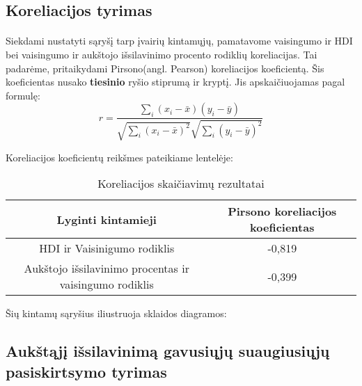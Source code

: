 \pagebreak


\subsection{Koreliacijos tyrimas}
\paragraph{} Siekdami nustatyti sąryšį tarp įvairių kintamųjų, pamatavome vaisingumo ir HDI bei vaisingumo ir aukštojo išsilavinimo procento rodiklių koreliacijas. Tai padarėme, pritaikydami Pirsono(angl. Pearson) koreliacijos koeficientą. Šis koeficientas nusako \textbf{tiesinio} ryšio stiprumą ir kryptį. Jis apskaičiuojamas pagal formulę: 
\begin{equation}
r = \frac{\sum\limits_i (x_i - \bar{x})(y_i - \bar{y})}{\sqrt{\sum\limits_i(x_i - \bar{x})^2}\sqrt{\sum\limits_i(y_i - \bar{y})^2}}
\end{equation}

Koreliacijos koeficientų reikšmes pateikiame lentelėje:
\begin{table}[H]
\begin{center}
    \caption{Koreliacijos skaičiavimų rezultatai}
    \begin{tabular}{|c|c|}
        \hline
        \textbf{Lyginti kintamieji} & \textbf{Pirsono koreliacijos koeficientas} \\\hline
        HDI ir Vaisinigumo rodiklis & -0,819 \\\hline
        Aukštojo išsilavinimo procentas ir vaisingumo rodiklis & -0,399 \\\hline
    \end{tabular}
\end{center}
\end{table}

Šių kintamų sąryšius iliustruoja sklaidos diagramos:
\begin{multicols}{2}
\end{multicols}

\pagebreak

\subsection{Aukštąjį išsilavinimą gavusiųjų suaugiusiųjų pasiskirtsymo tyrimas} 

